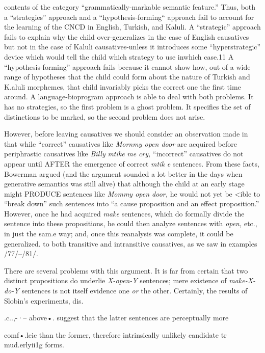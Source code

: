 contents of the category ``grammatically-markable semantic feature.'' Thus, both a ``strategies'' approach and a ``hypothesis-forming``
approach fail to account for the learning of the CNCD in English,
Turkish, and Kaluli. A ``strategic'' approach fails to explain why the
child over-generalizes in the case of English causatives but not in the case of Kaluli causatives-unless it introduces some ``hyperstrategic'' device which would tell the child which strategy to use inwhich case.11 A ``hypothesis-forming'' approach fails because it cannot show how, out of a wide range of hypotheses that the child could form about the nature of Turkish and K.aluli morphemes, that child invariably picks the correct one the first time around. A language-bioprogram approach is able to deal with both problems. It has no strategies, so the first problem is a ghost problem. It specifies the set of distinctions to be marked, so the second problem does not arise.

However, before leaving causatives we should consider an obser\-vation made in \citet{Bowerman1974} that while ``correct'' causatives like \textit{Mornmy open door }are acquired before periphrastic causatives like \textit{Billy }\textit{mtike} \textit{me} \textit{cry,} ``incorrect'' causatives do not appear until AFTER the emergence of correct \textit{mtik} \textit{e} sentences. From these facts, Bowerman argued (and the argument sounded a lot better in the days when genera\-tive semantics was still alive) that although the child at an early stage might PRODUCE sentences like \textit{Mommy open door, }he would not yet be {\textless}ible to ``break down'' such sentences into ``a cause proposition and an effect proposition.'' However, once he had acquired \textit{make} sentences, which do formally divide the sentence into these proposi\-tions, he could then analyze sentences with \textit{open, }etc., in just the sam.e way; and, once this reanalysis was complete, it could be generalized. to both transitive and intransitive causatives, as we saw in examples
/77/--/81/.

There are several problems with this argument. It is far from certain that two distinct propositions do underlie \textit{X-open-Y } sentences; mere existence of \textit{make-X-do-Y }sentences is not itself evidence one
\textit{or} the other. Certainly, the results of Slobin's experiments, dis.

.c..,-·-- above•. suggest that the latter sentences are perceptually more

comf•.leic than the former, therefore intrinsically unlikely candidate tr mud.erlyii1g forms.

